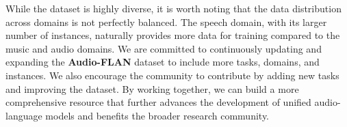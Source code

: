 While the dataset is highly diverse, it is worth noting that the data distribution across domains is not perfectly balanced. The speech domain, with its larger number of instances, naturally provides more data for training compared to the music and audio domains. We are committed to continuously updating and expanding the \textbf{Audio-FLAN} dataset to include more tasks, domains, and instances. We also encourage the community to contribute by adding new tasks and improving the dataset. By working together, we can build a more comprehensive resource that further advances the development of unified audio-language models and benefits the broader research community.









